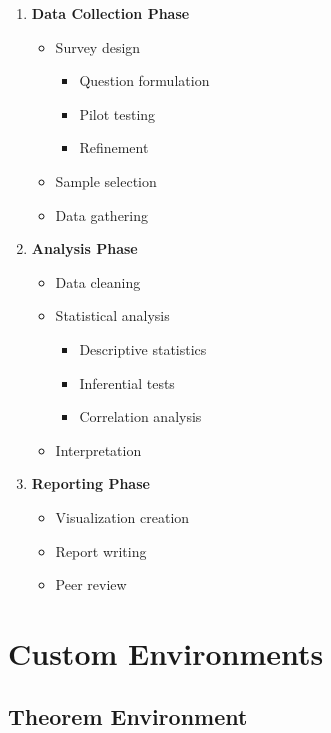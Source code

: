 \documentclass[12pt, a4paper]{article}
\begin{document}
\begin{enumerate}
    \item \textbf{Data Collection Phase}
    \begin{itemize}
        \item Survey design
        \begin{itemize}
            \item Question formulation
            \item Pilot testing
            \item Refinement
        \end{itemize}
        \item Sample selection
        \item Data gathering
    \end{itemize}
    
    \item \textbf{Analysis Phase}
    \begin{itemize}
        \item Data cleaning
        \item Statistical analysis
        \begin{itemize}
            \item Descriptive statistics
            \item Inferential tests
            \item Correlation analysis
        \end{itemize}
        \item Interpretation
    \end{itemize}
    
    \item \textbf{Reporting Phase}
    \begin{itemize}
        \item Visualization creation
        \item Report writing
        \item Peer review
    \end{itemize}
\end{enumerate}

\section{Custom Environments}

\subsection{Theorem Environment}
\end{document}
